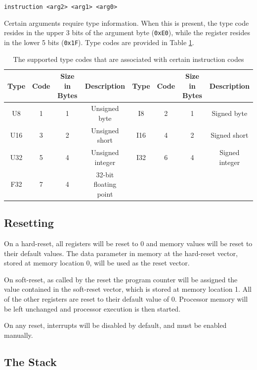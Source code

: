 \documentclass{article}
\begin{document}
\begin{center}
    \texttt{instruction <arg2> <arg1> <arg0>}
\end{center}

Certain arguments require type information. When this is present, the type code resides in the upper 3 bits of the argument byte (\texttt{0xE0}), while the register resides in the lower 5 bits (\texttt{0x1F}). Type codes are provided in Table \ref{table:type-codes}.

\begin{table}[h!]
	\centering
	\begin{tabular}{c|cc|c|c|cc|c|}
		\hline
		Type & Code & Size in Bytes & Description & Type & Code & Size in Bytes & Description \\
		\hline
		 U8 & 1 & 1 & Unsigned byte & I8 & 2 & 1 & Signed byte \\
		 U16 & 3 & 2 & Unsigned short& I16 & 4 & 2 & Signed short \\
		 U32 & 5 & 4 & Unsigned integer & I32 & 6 & 4 & Signed integer \\
		 F32 & 7 & 4 & 32-bit floating point & {} & {} & {} & {} \\
		\hline
	\end{tabular}
	\caption{The supported type codes that are associated with certain instruction codes}
	\label{table:type-codes}
\end{table}

\subsection{Resetting}

On a hard-reset, all registers will be reset to 0 and memory values will be reset to their default values. The data parameter in memory at the hard-reset vector, stored at memory location 0, will be used as the reset vector.

On soft-reset, as called by the reset the program counter will be assigned the value contained in the soft-reset vector, which is stored at memory location 1. All of the other registers are reset to their default value of 0. Processor memory will be left unchanged and processor execution is then started.

On any reset, interrupts will be disabled by default, and must be enabled manually.

\subsection{The Stack}
\label{sec:the-stack}
\end{document}
